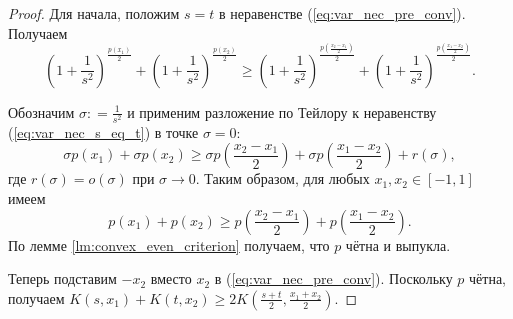 \begin{proof}
Для начала, положим $s = t$ в неравенстве (\ref{eq:var_nec_pre_conv}).
Получаем
\begin{equation}
\label{eq:var_nec_s_eq_t}
( 1 + { \frac 1 {s^2} } )^{\frac {p(x_1)} 2} + ( 1 + { \frac 1 {s^2} } )^{\frac {p(x_2)} 2}
\ge ( 1 + { \frac 1 {s^2} } )^{\frac {p( { \frac {x_2 - x_1} 2 } )}  2}
+ ( 1 + { \frac 1 {s^2} } )^{\frac {p( { \frac {x_1 - x_2}2 } )} 2}.
\end{equation}

Обозначим $\sigma: = {\frac 1 {s^2}}$ и применим разложение по Тейлору к неравенству (\ref{eq:var_nec_s_eq_t}) в точке $\sigma = 0$:
$$
\sigma p(x_1) + \sigma p(x_2) \ge \sigma p( {\frac { x_2 - x_1}2 } ) + \sigma p( {\frac { x_1 - x_2} 2 } ) + r(\sigma),
$$
где $r(\sigma) = o(\sigma)$ при $\sigma \to 0$.
Таким образом, для любых $x_1, x_2 \in [-1, 1]$ имеем
$$
p(x_1) + p(x_2) \ge p( { \frac {x_2 - x_1} 2 } ) + p( { \frac {x_1 - x_2} 2 } ).
$$
По лемме \ref{lm:convex_even_criterion} получаем, что $p$ чётна и выпукла.

Теперь подставим $-x_2$ вместо $x_2$ в (\ref{eq:var_nec_pre_conv}).
Поскольку $p$ чётна, получаем
$K(s, x_1) + K(t, x_2) \ge 2 K( { \frac {s + t}2 }, {\frac { x_1 + x_2}2 } )$.
\end{proof}
